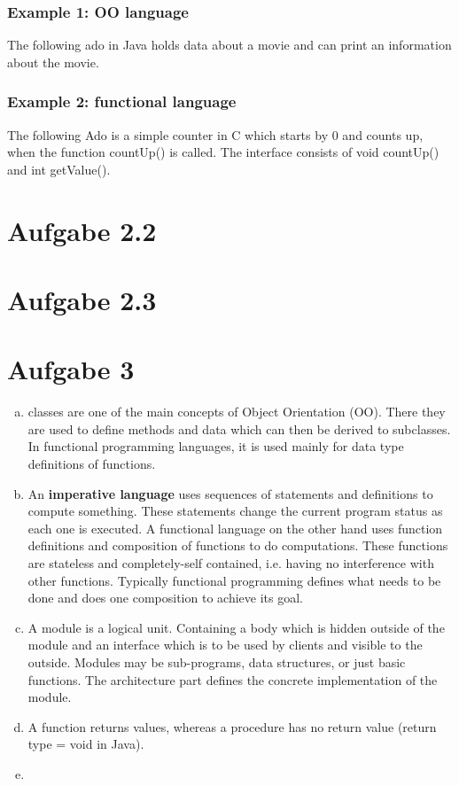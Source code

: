 \documentclass[a4paper,10pt]{scrartcl}[2003/01/01]
\begin{document}
	\subsubsection*{Example 1: OO language}
	The following ado in Java holds data about a movie and can print an information about the movie. 
	
	
	\subsubsection*{Example 2: functional language}
	The following Ado is a simple counter in C which starts by 0 and counts up, when the function countUp() is called. The interface consists of void countUp() and int getValue().
	
	
	
	\section*{Aufgabe 2.2}
	
	\section*{Aufgabe 2.3}
	
	\section{Aufgabe 3}
	\begin{enumerate}[a)]
		\item classes are one of the main concepts of Object Orientation (OO). There they are used to define methods and data which can then be derived to subclasses. In functional programming languages, it is used mainly for data type definitions of functions.
		\item An \textbf{imperative language} uses sequences of statements and definitions to compute something. These statements change the current program status as each one is executed. A functional language on the other hand uses function definitions and composition of functions to do computations. These functions are stateless and completely-self contained, i.e. having no interference with other functions. Typically functional programming defines what needs to be done and does one composition to achieve its goal.
		\item A module is a logical unit. Containing a body which is hidden outside of the module and an interface which is to be used by clients and visible to the outside. Modules may be sub-programs, data structures, or just basic functions. The architecture part defines the concrete implementation of the module.
		\item A function returns values, whereas a procedure has no return value (return type = void in Java).
		\item 
	\end{enumerate}
	
\end{document}
